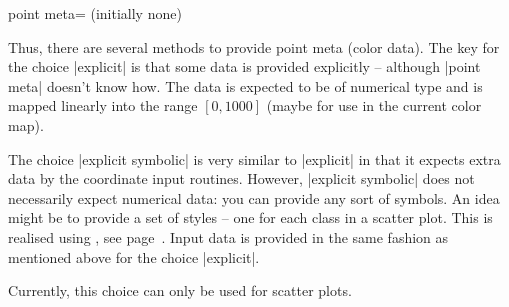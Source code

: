\begin{pgfplotskey}{point meta= (initially none)}
\begin{description}
\begin{codeexample}
\end{codeexample}
		Thus, there are several methods to provide point meta (color data). The key for the choice |explicit| is that some data is provided explicitly -- although |point meta| doesn't know how. The data is expected to be of numerical type and is mapped linearly into the range $[0,1000]$ (maybe for use in the current color map).

		\item[\declaretext{explicit symbolic}] The choice |explicit symbolic| is very similar to |explicit| in that it expects extra data by the coordinate input routines. However, |explicit symbolic| does not necessarily expect numerical data: you can provide any sort of symbols. An idea might be to provide a set of styles -- one for each class in a scatter plot. This is realised using , see page~\pageref{pgfplots:scatterclasses}. Input data is provided in the same fashion as mentioned above for the choice |explicit|. 
		
		Currently, this choice can only be used for scatter plots.


\end{description}
\end{pgfplotskey}
